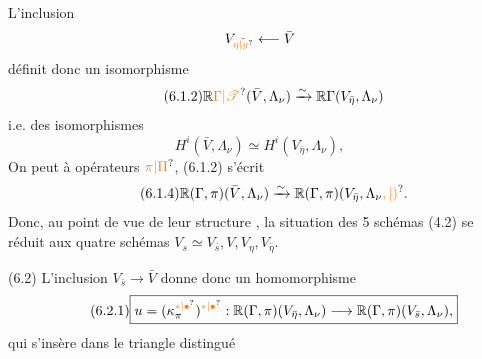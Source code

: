 L'inclusion
\[
V_{\bar{\unsure{\eta|y}}}\longleftarrow\bar V
\]
définit donc un isomorphisme
\[
\tag*{(6.1.2)}
\mathbb{R}\unsure{\Gamma|\mathscr{T}}(\bar V,\Lambda_\nu)\xrightarrow{\sim}\mathbb{R}\Gamma(V_{\bar\eta},\Lambda_\nu)
\]
i.e. des isomorphismes
\[
\tag*{(6.1.3)}H^i(\bar V,\Lambda_\nu)\simeq H^i(V_{\bar\eta},\Lambda_\nu),
\]
On peut   à opérateurs $\unsure{\pi|\Pi}$, (6.1.2)  s'écrit
\[
\tag*{(6.1.4)}\mathbb{R}(\Gamma,\pi)(\bar V,\Lambda_\nu)\xrightarrow{\sim}\mathbb{R}(\Gamma,\pi)(V_{\bar\eta},\Lambda_\nu\unsure{,|)}.
\]
Donc, au point de vue de leur structure , la situation des 5 schémas (4.2) se réduit aux quatre schémas $V_s\simeq V_{\bar s},V,V_\eta,V_{\bar\eta}$.

(6.2) L'inclusion $V_{\bar s}\longrightarrow\bar V$ donne donc un homomorphisme 
\[
\tag*{(6.2.1)}
\boxed{u=(\kappa_\pi^{\unsure{*|\bullet}})^{\unsure{*|\bullet}}:\mathbb{R}(\Gamma,\pi)(V_{\bar\eta},\Lambda_\nu)\longrightarrow\mathbb{R}(\Gamma,\pi)(V_{\bar s},\Lambda_\nu),}
\]
qui  s'insère dans le triangle distingué
\diagram{\[
\tag*{(6.2.2)}
\begin{tikzcd}[ampersand replacement=\&,column sep=small]
\& {\mathbb{R}(\Gamma,\pi)(V_{\bar s},\Lambda_\nu)\simeq\mathbb{R}\Gamma(V_s,\Lambda_\nu)^{\mathrm{triv}}=L^{\bullet\,\mathrm{triv}}}\arrow[dl] \& \\
{R^\bullet=\mathbb{R}(\Gamma,\pi)(\bar V,(\Lambda_\nu)_{V_{\bar\eta},\bar V})}\arrow[rr] \& \& {\mathbb{R}(\Gamma,\pi)(V_{\bar\eta},\Lambda_\nu)=K^\bullet}\arrow[ul]
\end{tikzcd}
\]}

